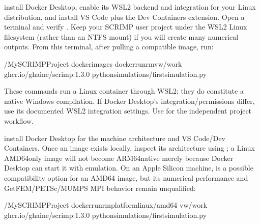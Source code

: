 \documentclass[letterpaper,10pt,english]{sphinxmanual}
\begin{document}
\sphinxAtStartPar
{} install Docker Desktop, enable its WSL2
backend and integration for your Linux distribution, and install
VS Code plus the Dev Containers extension. Open a 
terminal and verify . Keep your SCRIMP user
project under the WSL2 Linux filesystem (rather than an NTFS
 mount) if you will create many numerical outputs.
From this terminal, after pulling a compatible image, run:

\begin{sphinxVerbatim}[commandchars=\\\{\}]
\PYGZti{}/MySCRIMPProject
dockerimages
dockerrun\PYGZhy{}\PYGZhy{}rm\PYGZhy{}v\PYGZhy{}w/work
ghcr.io/g\PYGZhy{}haine/scrimp:1.3.0
pythonsimulations/first\PYGZus{}simulation.py
\end{sphinxVerbatim}

\sphinxAtStartPar
These commands run a Linux container through WSL2; they do 
constitute a native Windows compilation. If Docker Desktop’s
integration/permissions differ, use its documented WSL2 integration
settings. Use {\hyperref[\detokenize{vscode::doc}]{}} for the independent project workflow.

\sphinxAtStartPar
{} install Docker Desktop for the
machine architecture and VS Code/Dev Containers. Once an image
exists locally, inspect its architecture using
; a Linux AMD64\sphinxhyphen{}only image
will not become ARM64\sphinxhyphen{}native merely because Docker Desktop
can start it with emulation. On an Apple Silicon machine,
 is a possible 
compatibility option for an AMD64 image, but its numerical
performance and GetFEM/PETSc/MUMPS MPI behavior remain unqualified:

\begin{sphinxVerbatim}[commandchars=\\\{\}]
\PYGZti{}/MySCRIMPProject
dockerrun\PYGZhy{}\PYGZhy{}rm\PYGZhy{}\PYGZhy{}platformlinux/amd64
\PYGZhy{}v\PYGZhy{}w/work
ghcr.io/g\PYGZhy{}haine/scrimp:1.3.0
pythonsimulations/first\PYGZus{}simulation.py
\end{sphinxVerbatim}
\end{document}
